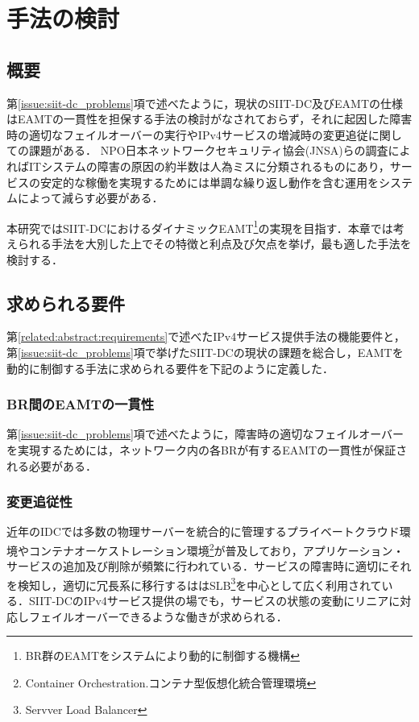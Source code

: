 \chapter{手法の検討}
\label{consideration}

\section{概要}
第\ref{issue:siit-dc_problems}項で述べたように，現状のSIIT-DC及びEAMTの仕様はEAMTの一貫性を担保する手法の検討がなされておらず，それに起因した障害時の適切なフェイルオーバーの実行やIPv4サービスの増減時の変更追従に関しての課題がある．
NPO日本ネットワークセキュリティ協会(JNSA)らの調査によればITシステムの障害の原因の約半数は人為ミスに分類されるものにあり\cite{human_error}，サービスの安定的な稼働を実現するためには単調な繰り返し動作を含む運用をシステムによって減らす必要がある．

本研究ではSIIT-DCにおけるダイナミックEAMT\footnote{BR群のEAMTをシステムにより動的に制御する機構}の実現を目指す．本章では考えられる手法を大別した上でその特徴と利点及び欠点を挙げ，最も適した手法を検討する．


\section{求められる要件}
\label{consideration:points}

第\ref{related:abstract:requirements}で述べたIPv4サービス提供手法の機能要件と，第\ref{issue:siit-dc_problems}項で挙げたSIIT-DCの現状の課題を総合し，EAMTを動的に制御する手法に求められる要件を下記のように定義した．

\subsection{BR間のEAMTの一貫性}
第\ref{issue:siit-dc_problems}項で述べたように，障害時の適切なフェイルオーバーを実現するためには，ネットワーク内の各BRが有するEAMTの一貫性が保証される必要がある．

\subsection{変更追従性}
近年のIDCでは多数の物理サーバーを統合的に管理するプライベートクラウド環境やコンテナオーケストレーション環境\footnote{Container Orchestration.コンテナ型仮想化統合管理環境}が普及しており，アプリケーション・サービスの追加及び削除が頻繁に行われている．サービスの障害時に適切にそれを検知し，適切に冗長系に移行するははSLB\footnote{Servver Load Balancer}を中心として広く利用されている．SIIT-DCのIPv4サービス提供の場でも，サービスの状態の変動にリニアに対応しフェイルオーバーできるような働きが求められる．

